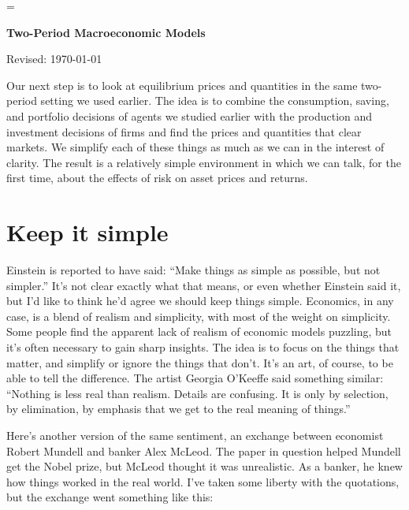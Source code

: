 \documentclass[11pt]{article}
\begin{document}
\parskip=\bigskipamount
\parindent=0.0in
\thispagestyle{empty}


\bigskip\bigskip
\centerline{\Large \bf Two-Period Macroeconomic Models}
\centerline{Revised: \today}

\bigskip
Our next step is to look at equilibrium prices and quantities
in the same two-period setting we used earlier.
The idea is to combine the consumption,
saving, and portfolio decisions of agents we studied earlier
with the production and investment decisions of firms
and find the prices and quantities that clear markets.
We simplify each of these things as much as we can
in the interest of clarity.
The result is a relatively simple environment in which
we can talk, for the first time, about the effects
of risk on asset prices and returns.



\section{Keep it simple}

Einstein is reported to have said:
``Make things as simple as possible, but not simpler.''
It's not clear exactly what that means, or even whether Einstein said it,
but I'd like to think he'd agree we should keep things simple.
Economics, in any case, is a blend of realism and simplicity,
with most of the weight on simplicity.
Some people find the apparent lack of realism of economic models puzzling,
but it's often necessary to gain sharp insights.
The idea is to focus on the things that matter,
and simplify or ignore the things that don't.
It's an art, of course, to be able to tell the difference.
The artist Georgia O'Keeffe said something similar:
``Nothing is less real than realism. Details are confusing. It is only by
selection, by elimination, by emphasis that we get to the real meaning of
things.''


Here's another version of the same sentiment,
an exchange between economist Robert Mundell and banker Alex McLeod.
The paper in question helped Mundell get the Nobel prize,
but McLeod thought it was unrealistic.
As a banker, he knew how things worked in the real world.
I've taken some liberty with the quotations, but the exchange went something like this:
\end{document}
